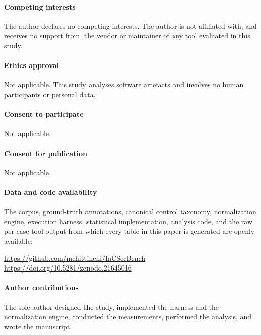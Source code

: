 \documentclass[smallextended]{svjour3}
\begin{document}
\paragraph{Competing interests} The author declares no competing interests. The
author is not affiliated with, and receives no support from, the vendor or
maintainer of any tool evaluated in this study.

\paragraph{Ethics approval} Not applicable. This study analyses software
artefacts and involves no human participants or personal data.

\paragraph{Consent to participate} Not applicable.

\paragraph{Consent for publication} Not applicable.

\paragraph{Data and code availability} The corpus, ground-truth annotations,
canonical control taxonomy, normalization engine, execution harness, statistical
implementation, analysis code, and the raw per-case tool output from which every
table in this paper is generated are openly available:

\begin{center}
\url{https://github.com/mchittineni/IaCSecBench}\\
\url{https://doi.org/10.5281/zenodo.21645016}
\end{center}

\paragraph{Author contributions} The sole author designed the study, implemented
the harness and the normalization engine, conducted the measurements, performed
the analysis, and wrote the manuscript.
\end{document}
